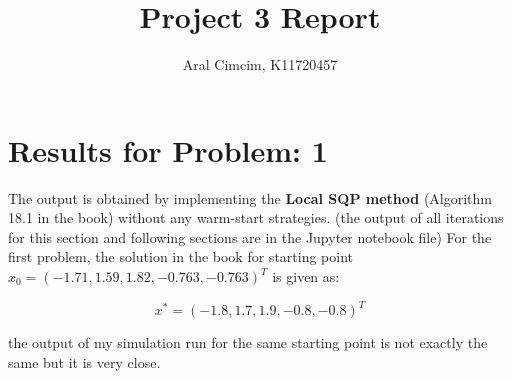 \documentclass{article}
\begin{document}
\title{Project 3 Report}

\author{Aral Cimcim, K11720457}


\maketitle

\section*{Results for Problem: 1}
The output is obtained by implementing the \textbf{Local SQP method} (Algorithm 18.1 in the book)
without any warm-start strategies. (the output of all iterations for this section and following sections are in the Jupyter notebook file) For the first problem, the solution in the book for starting
point $x_0 = (-1.71, 1.59, 1.82, -0.763, -0.763)^T$ is given as:

\begin{equation}
    x^* = (-1.8, 1.7, 1.9, -0.8, -0.8)^T
\end{equation}

the output of my simulation run for the same starting point is not exactly the same but it is very close.
\end{document}
